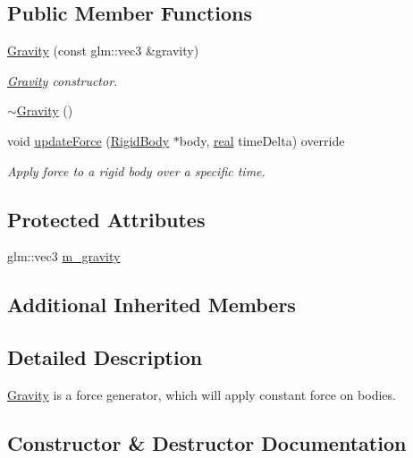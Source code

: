 \subsection*{Public Member Functions}
\begin{DoxyCompactItemize}
\item 
\mbox{\hyperlink{classr3_1_1_gravity_a1c5f6d085a7b1484c23f5a6df4b58b05}{Gravity}} (const glm\+::vec3 \&gravity)
\begin{DoxyCompactList}\small\item\em \mbox{\hyperlink{classr3_1_1_gravity}{Gravity}} constructor. \end{DoxyCompactList}\item 
\mbox{\hyperlink{classr3_1_1_gravity_abdf3edf32d08b6c5b9c2fc161635f993}{$\sim$\+Gravity}} ()
\item 
void \mbox{\hyperlink{classr3_1_1_gravity_ae3152c6a922ffa193aee362e161cd4a9}{update\+Force}} (\mbox{\hyperlink{classr3_1_1_rigid_body}{Rigid\+Body}} $\ast$body, \mbox{\hyperlink{namespacer3_ab2016b3e3f743fb735afce242f0dc1eb}{real}} time\+Delta) override
\begin{DoxyCompactList}\small\item\em Apply force to a rigid body over a specific time. \end{DoxyCompactList}\end{DoxyCompactItemize}
\subsection*{Protected Attributes}
\begin{DoxyCompactItemize}
\item 
glm\+::vec3 \mbox{\hyperlink{classr3_1_1_gravity_a2feb1d84fc4118e6e30b707a7224f6ef}{m\+\_\+gravity}}
\end{DoxyCompactItemize}
\subsection*{Additional Inherited Members}


\subsection{Detailed Description}
\mbox{\hyperlink{classr3_1_1_gravity}{Gravity}} is a force generator, which will apply constant force on bodies. 

\subsection{Constructor \& Destructor Documentation}
\mbox{\label{classr3_1_1_gravity_a1c5f6d085a7b1484c23f5a6df4b58b05}} 
